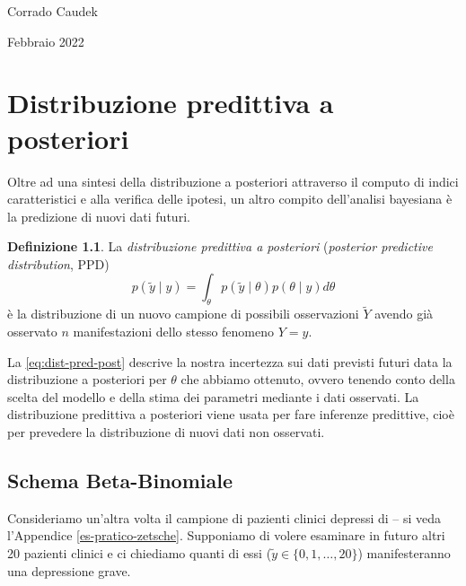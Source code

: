 \documentclass[
  11pt,
  italian,
  a4paper,
  extrafontsizes,onecolumn,openright
  ]{memoir}
\theoremstyle{definition}
\newtheorem{definition}{Definizione}[chapter]
\theoremstyle{definition}
\theoremstyle{definition}
\theoremstyle{definition}
\theoremstyle{remark}
\begin{document}
Corrado Caudek

\bigskip

Febbraio 2022

\mainmatter

\hypertarget{chapter-ppc}{%
\chapter{Distribuzione predittiva a posteriori}\label{chapter-ppc}}

Oltre ad una sintesi della distribuzione a posteriori attraverso il computo di indici caratteristici e alla verifica delle ipotesi, un altro compito dell'analisi bayesiana è la predizione di nuovi dati futuri.

\begin{definition}
La \emph{distribuzione predittiva a posteriori} (\emph{posterior predictive distribution}, PPD)
\begin{equation}
p(\tilde{y} \mid y) = \int_{\theta} p(\tilde{y} \mid \theta) p(\theta \mid y) d\theta
\label{eq:dist-pred-post}
\end{equation}
\noindent
è la distribuzione di un nuovo campione di possibili osservazioni \(\tilde{Y}\) avendo già osservato \(n\) manifestazioni dello stesso fenomeno \(Y = y\).
\end{definition}

La \eqref{eq:dist-pred-post} descrive la nostra incertezza sui dati previsti futuri data la distribuzione a posteriori per \(\theta\) che abbiamo ottenuto, ovvero tenendo conto della scelta del modello e della stima dei parametri mediante i dati osservati. La distribuzione predittiva a posteriori viene usata per fare inferenze predittive, cioè per prevedere la distribuzione di nuovi dati non osservati.

\hypertarget{schema-beta-bin-distr-pred-post}{%
\section{Schema Beta-Binomiale}\label{schema-beta-bin-distr-pred-post}}

Consideriamo un'altra volta il campione di pazienti clinici depressi di \textcite{zetschefuture2019} -- si veda l'Appendice \ref{es-pratico-zetsche}. Supponiamo di volere esaminare in futuro altri 20 pazienti clinici e ci chiediamo quanti di essi (\(\tilde{y} \in \{0, 1, \dots, 20\}\)) manifesteranno una depressione grave.
\end{document}
